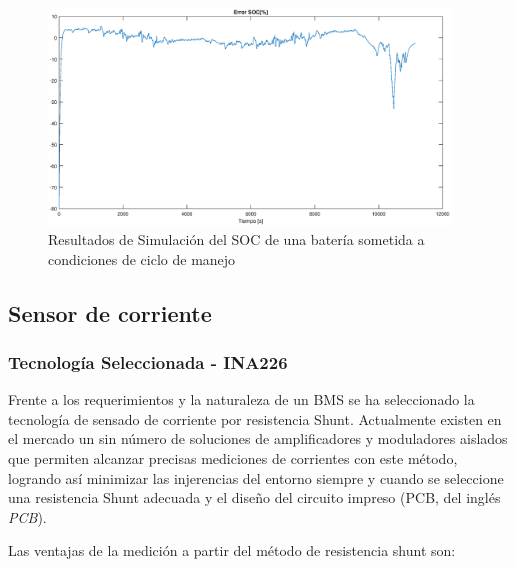 \documentclass[10pt,a4paper]{article}
\begin{document}
\begin{figure}[h!]
    \begin{center}
	\includegraphics[width=0.95\textwidth]{soc_error_porc.eps}
	\caption{Resultados de Simulación del SOC de una batería sometida a
	condiciones de ciclo de manejo}
	\label{error_SOC_Sim}
    \end{center}
\end{figure}
\FloatBarrier

\subsection{Sensor de corriente}

\subsubsection{Tecnología Seleccionada - INA226}

Frente a los requerimientos y la naturaleza de un \acrshort{BMS} se ha
seleccionado la tecnología de sensado de corriente por resistencia Shunt.
Actualmente existen en el mercado un sin número de soluciones de amplificadores
y moduladores aislados que permiten alcanzar precisas mediciones de corrientes
con este método, logrando as\'i minimizar las injerencias del entorno siempre 
y cuando se seleccione una resistencia Shunt adecuada y el diseño del circuito
impreso (\acrshort{PCB}, del ingl\'es \emph{\acrlong{PCB}}).

\noindent Las ventajas de la medición a partir del método de resistencia 
shunt son:
\end{document}
